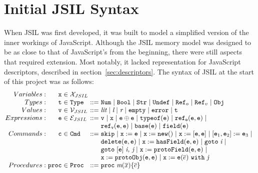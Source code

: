\documentclass[a4paper,11pt,twoside]{report}
\begin{document}
\section{Initial JSIL Syntax}
When JSIL was first developed, it was built to model a simplified version of the inner workings of JavaScript. Although the JSIL memory model was designed to be as close to that of JavaScript's from the beginning, there were still aspects that required extension. Most notably, it lacked representation for JavaScript descriptors, described in section~\ref{sec:descriptors}.
The syntax of JSIL at the start of this project was as follows:
$$
\arraycolsep=1.5pt
\begin{array}{rrclcl}
Variables : &  \mathtt{x} & \in & \mathcal{X}_{JSIL} \\
Types: & \mathtt{t} & \in & \mathtt{Type} & ::= & \mathtt{Num} \myor \mathtt{Bool} \myor \mathtt{Str} \myor \mathtt{Undef} \myor \mathtt{Ref}_o \myor \mathtt{Ref}_v \myor \mathtt{Obj} \\
Values: & \mathtt{v} & \in & \mathcal{V}_{JSIL} & ::= &\textit{lit} \myor \textit{l} \myor \textit{r} \myor \mathtt{empty} \myor \mathtt{error} \myor \mathtt{t} \\
Expressions: & \mathtt{e} & \in & \mathcal{E}_{JSIL} & ::= &\mathtt{v} \myor \mathtt{x} \myor \mathtt{e} \oplus \mathtt{e} \myor \mathtt{typeof}(\mathtt{e}) \myor \mathtt{ref_o}(\mathtt{e,e}) \myor \\
& & & & & \mathtt{ref_v}(\mathtt{e,e}) \myor \mathtt{base}(\mathtt{e}) \myor \mathtt{field}(\mathtt{e}) 
\\
Commands: & \mathtt{c} & \in & \mathtt{Cmd} & ::= & \mathtt{skip} \myor \mathtt{x} := \mathtt{e} \myor \mathtt{x} := \mathtt{new}() \myor \mathtt{x} := [\mathtt{e,e}] \myor [\mathtt{e}_1,\mathtt{e}_2] := \mathtt{e}_3 \myor  \\
& & & & & \mathtt{delete}(\mathtt{e,e}) \myor \mathtt{x} := \mathtt{hasField}(\mathtt{e,e}) \myor \mathtt{goto} \hspace{3pt} \textit{i} \myor \\
& & & & & \mathtt{goto} \hspace{3pt} [\mathtt{e}] \hspace{3pt} \textit{i, j} \myor \mathtt{x} := \mathtt{protoField} (\mathtt{e,e}) \myor \\
& & & & & \mathtt{x} := \mathtt{protoObj}(\mathtt{e,e}) \myor \mathtt{x} := \mathtt{e}(\overline{e})\ \mathtt{with}\ \textit{j}
\\
Procedures: & \mathtt{proc} & \in & \mathtt{Proc} & ::= & \mathtt{proc} \hspace{3pt} \textit{m}(\overline{x})\{\overline{c}\}
\end{array}
$$
\end{document}
